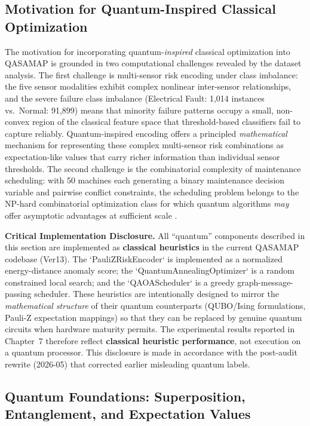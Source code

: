 \subsection{Motivation for Quantum-Inspired Classical Optimization}
\label{sec:quantum_integration}

The motivation for incorporating quantum-\emph{inspired} classical optimization into QASAMAP is grounded in two computational challenges revealed by the dataset analysis. The first challenge is multi-sensor risk encoding under class imbalance: the five sensor modalities exhibit complex nonlinear inter-sensor relationships, and the severe failure class imbalance (Electrical Fault: 1,014 instances vs.\ Normal: 91,899) means that minority failure patterns occupy a small, non-convex region of the classical feature space that threshold-based classifiers fail to capture reliably. Quantum-inspired encoding offers a principled \emph{mathematical} mechanism for representing these complex multi-sensor risk combinations as expectation-like values that carry richer information than individual sensor thresholds. The second challenge is the combinatorial complexity of maintenance scheduling: with 50 machines each generating a binary maintenance decision variable and pairwise conflict constraints, the scheduling problem belongs to the NP-hard combinatorial optimization class for which quantum algorithms \emph{may} offer asymptotic advantages at sufficient scale \cite{Blekos2024}.

\textbf{Critical Implementation Disclosure.} All ``quantum'' components described in this section are implemented as \textbf{classical heuristics} in the current QASAMAP codebase (Ver13). The `PauliZRiskEncoder` is implemented as a normalized energy-distance anomaly score; the `QuantumAnnealingOptimizer` is a random constrained local search; and the `QAOAScheduler` is a greedy graph-message-passing scheduler. These heuristics are intentionally designed to mirror the \emph{mathematical structure} of their quantum counterparts (QUBO/Ising formulations, Pauli-Z expectation mappings) so that they can be replaced by genuine quantum circuits when hardware maturity permits. The experimental results reported in Chapter~7 therefore reflect \textbf{classical heuristic performance}, not execution on a quantum processor. This disclosure is made in accordance with the post-audit rewrite (2026-05) that corrected earlier misleading quantum labels.

\subsection{Quantum Foundations: Superposition, Entanglement, and Expectation Values}

